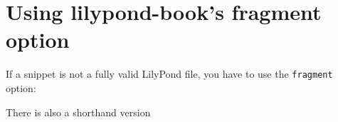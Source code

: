 \documentclass[a4paper, 12pt]{article}
\begin{document}
\section{Using lilypond-book's fragment option}

If a snippet is not a fully valid LilyPond file, you have
to use the \verb|fragment| option:

{%
\parindent 0pt
\noindent
\ifx\preLilyPondExample \undefined
\else
  \expandafter\preLilyPondExample
\fi
\def\lilypondbook{}%

\ifx\postLilyPondExample \undefined
\else
  \expandafter\postLilyPondExample
\fi
}

There is also a shorthand version %

{%
\parindent 0pt
\noindent
\ifx\preLilyPondExample \undefined
\else
  \expandafter\preLilyPondExample
\fi
\def\lilypondbook{}%

\ifx\postLilyPondExample \undefined
\else
  \expandafter\postLilyPondExample
\fi
}
\end{document}
